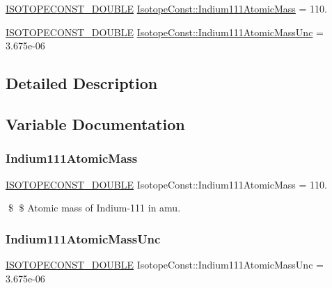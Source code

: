 \begin{DoxyCompactItemize}
\item 
\mbox{\hyperlink{group___isotope_const-_macros_ga8f45a7272ce02c0b4c65c44636ed719a}{I\+S\+O\+T\+O\+P\+E\+C\+O\+N\+S\+T\+\_\+\+D\+O\+U\+B\+LE}} \mbox{\hyperlink{group___isotope_const-_indium-_in111_ga926832af61d9b3b1acac99987997b6e9}{Isotope\+Const\+::\+Indium111\+Atomic\+Mass}} = 110.
\item 
\mbox{\hyperlink{group___isotope_const-_macros_ga8f45a7272ce02c0b4c65c44636ed719a}{I\+S\+O\+T\+O\+P\+E\+C\+O\+N\+S\+T\+\_\+\+D\+O\+U\+B\+LE}} \mbox{\hyperlink{group___isotope_const-_indium-_in111_gac134fcd4096ce13213aab5d498e905d3}{Isotope\+Const\+::\+Indium111\+Atomic\+Mass\+Unc}} = 3.\+675e-\/06
\end{DoxyCompactItemize}


\subsection{Detailed Description}


\subsection{Variable Documentation}
\mbox{\label{group___isotope_const-_indium-_in111_ga926832af61d9b3b1acac99987997b6e9}} 
\subsubsection{\texorpdfstring{Indium111\+Atomic\+Mass}{Indium111AtomicMass}}
{\footnotesize\ttfamily \mbox{\hyperlink{group___isotope_const-_macros_ga8f45a7272ce02c0b4c65c44636ed719a}{I\+S\+O\+T\+O\+P\+E\+C\+O\+N\+S\+T\+\_\+\+D\+O\+U\+B\+LE}} Isotope\+Const\+::\+Indium111\+Atomic\+Mass = 110.}

\$ \$ Atomic mass of Indium-\/111 in amu. \mbox{\label{group___isotope_const-_indium-_in111_gac134fcd4096ce13213aab5d498e905d3}} 
\subsubsection{\texorpdfstring{Indium111\+Atomic\+Mass\+Unc}{Indium111AtomicMassUnc}}
{\footnotesize\ttfamily \mbox{\hyperlink{group___isotope_const-_macros_ga8f45a7272ce02c0b4c65c44636ed719a}{I\+S\+O\+T\+O\+P\+E\+C\+O\+N\+S\+T\+\_\+\+D\+O\+U\+B\+LE}} Isotope\+Const\+::\+Indium111\+Atomic\+Mass\+Unc = 3.\+675e-\/06}

